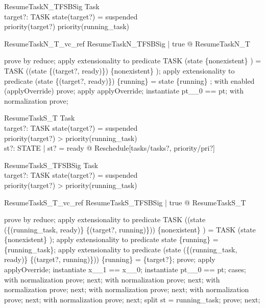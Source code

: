 \documentclass[a4paper, 12pt]{article}
\begin{document}
\begin{schema}{ResumeTaskN\_TFSBSig}
  Task\\
  target?: TASK
\where
  state(target?) = suspended\\
  priority(target?) \leq  priority(running\_task)
\end{schema}

\begin{theorem}{ResumeTaskN\_T\_vc\_ref}
\forall  ResumeTaskN\_TFSBSig | true @ \pre  ResumeTaskN\_T
\end{theorem}

\begin{zproof}
prove by reduce;
apply extensionality to predicate TASK \setminus  (state \inv  \limg  \{nonexistent\} \rimg ) = TASK \setminus  ((state \oplus  \{(target?, ready)\}) \inv  \limg  \{nonexistent\} \rimg );
apply extensionality to predicate (state \oplus  \{(target?, ready)\}) \inv  \limg  \{running\} \rimg  = state \inv  \limg  \{running\} \rimg ;
with enabled (applyOverride) prove;
apply applyOverride;
instantiate pt\_\_0 == pt;
with normalization prove;
\end{zproof}

\begin{schema}{ResumeTaskS\_T}
  \Delta Task\\
  target?: TASK
\where
  state(target?) = suspended\\
  priority(target?) > priority(running\_task)\\
  \exists  st?: STATE | st? = ready @ Reschedule[tasks/tasks?, priority/pri?]
\end{schema}

\begin{schema}{ResumeTaskS\_TFSBSig}
  Task\\
  target?: TASK
\where
  state(target?) = suspended\\
  priority(target?) > priority(running\_task)
\end{schema}

\begin{theorem}{ResumeTaskS\_T\_vc\_ref}
\forall  ResumeTaskS\_TFSBSig | true @ \pre  ResumeTaskS\_T
\end{theorem}

\begin{zproof}
prove by reduce;
apply extensionality to predicate TASK \setminus  ((state \oplus  (\{(running\_task, ready)\} \cup  \{(target?, running)\})) \inv  \limg  \{nonexistent\} \rimg ) = TASK \setminus  (state \inv  \limg  \{nonexistent\} \rimg );
apply extensionality to predicate state \inv  \limg  \{running\} \rimg  = \{running\_task\};
apply extensionality to predicate (state \oplus  (\{(running\_task, ready)\} \cup  \{(target?, running)\})) \inv  \limg  \{running\} \rimg  = \{target?\};
prove;
apply applyOverride;
instantiate x\_\_1 == x\_\_0;
instantiate pt\_\_0 == pt;
cases;
with normalization prove;
next;
with normalization prove;
next;
with normalization prove;
next;
with normalization prove;
next;
with normalization prove;
next;
with normalization prove;
next;
split st = running\_task;
prove;
next;
\end{zproof}
\end{document}
